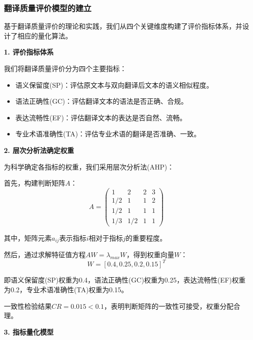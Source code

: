 \documentclass[bwprint]{cumcmthesis}
\begin{document}
\subsubsection{翻译质量评价模型的建立}
基于翻译质量评价的理论和实践，我们从四个关键维度构建了评价指标体系，并设计了相应的量化算法。

\textbf{1. 评价指标体系}

我们将翻译质量评价分为四个主要指标：
\begin{itemize}
    \item 语义保留度(SP)：评估原文本与双向翻译后文本的语义相似程度。
    \item 语法正确性(GC)：评估翻译文本的语法是否正确、合规。
    \item 表达流畅性(EF)：评估翻译文本的表达是否自然、流畅。
    \item 专业术语准确性(TA)：评估专业术语的翻译是否准确、一致。
\end{itemize}

\textbf{2. 层次分析法确定权重}

为科学确定各指标的权重，我们采用层次分析法(AHP)：

首先，构建判断矩阵$A$：
\begin{equation}
A = \begin{pmatrix}
1 & 2 & 2 & 3 \\
1/2 & 1 & 1 & 2 \\
1/2 & 1 & 1 & 1 \\
1/3 & 1/2 & 1 & 1
\end{pmatrix}
\end{equation}

其中，矩阵元素$a_{ij}$表示指标$i$相对于指标$j$的重要程度。

然后，通过求解特征值方程$AW = \lambda_{max}W$，得到权重向量$W$：
\begin{equation}
W = [0.4, 0.25, 0.2, 0.15]^T
\end{equation}

即语义保留度(SP)权重为0.4，语法正确性(GC)权重为0.25，表达流畅性(EF)权重为0.2，专业术语准确性(TA)权重为0.15。

一致性检验结果$CR = 0.015 < 0.1$，表明判断矩阵的一致性可接受，权重分配合理。

\textbf{3. 指标量化模型}
\end{document}
